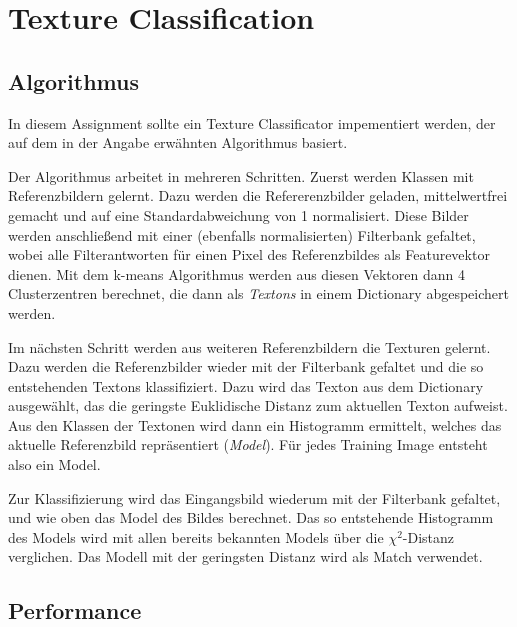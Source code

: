 
\chapter{Texture Classification}


\section{Algorithmus}

In diesem Assignment sollte ein Texture Classificator impementiert werden, der auf dem in der Angabe erwähnten Algorithmus basiert.

Der Algorithmus arbeitet in mehreren Schritten. Zuerst werden Klassen mit Referenzbildern gelernt. Dazu werden die Refererenzbilder geladen, mittelwertfrei gemacht und auf eine Standardabweichung von 1 normalisiert. Diese Bilder werden anschließend mit einer (ebenfalls normalisierten) Filterbank gefaltet, wobei alle Filterantworten für einen Pixel des Referenzbildes als Featurevektor dienen. Mit dem k-means Algorithmus werden aus diesen Vektoren dann 4 Clusterzentren berechnet, die dann als \emph{Textons} in einem Dictionary abgespeichert werden.

Im nächsten Schritt werden aus weiteren Referenzbildern die Texturen gelernt. Dazu werden die Referenzbilder wieder mit der Filterbank gefaltet und die so entstehenden Textons klassifiziert. Dazu wird das Texton aus dem Dictionary ausgewählt, das die geringste Euklidische Distanz zum aktuellen Texton aufweist. Aus den Klassen der Textonen wird dann ein Histogramm ermittelt, welches das aktuelle Referenzbild repräsentiert (\emph{Model}). Für jedes Training Image entsteht also ein Model.

Zur Klassifizierung wird das Eingangsbild wiederum mit der Filterbank gefaltet, und wie oben das Model des Bildes berechnet. Das so entstehende Histogramm des Models wird mit allen bereits bekannten Models über die $\chi^2$-Distanz verglichen. Das Modell mit der geringsten Distanz wird als Match verwendet.



\section{Performance}

